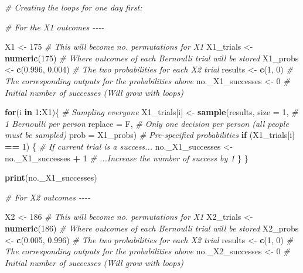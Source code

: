 \documentclass[
]{article}
\newenvironment{Shaded}{\begin{snugshade}}{\end{snugshade}}
\newcommand{\AttributeTok}[1]{\textcolor[rgb]{0.13,0.29,0.53}{#1}}
\newcommand{\CommentTok}[1]{\textcolor[rgb]{0.56,0.35,0.01}{\textit{#1}}}
\newcommand{\ControlFlowTok}[1]{\textcolor[rgb]{0.13,0.29,0.53}{\textbf{#1}}}
\newcommand{\DecValTok}[1]{\textcolor[rgb]{0.00,0.00,0.81}{#1}}
\newcommand{\FloatTok}[1]{\textcolor[rgb]{0.00,0.00,0.81}{#1}}
\newcommand{\FunctionTok}[1]{\textcolor[rgb]{0.13,0.29,0.53}{\textbf{#1}}}
\newcommand{\NormalTok}[1]{#1}
\newcommand{\OtherTok}[1]{\textcolor[rgb]{0.56,0.35,0.01}{#1}}
\newcommand{\SpecialCharTok}[1]{\textcolor[rgb]{0.81,0.36,0.00}{\textbf{#1}}}
\begin{document}
\begin{Shaded}
\begin{Highlighting}[]
\CommentTok{\# Creating the loops for one day first:}

\CommentTok{\# For the X1 outcomes {-}{-}{-}{-}}

\NormalTok{X1 }\OtherTok{\textless{}{-}} \DecValTok{175}  \CommentTok{\# This will become no. permutations for X1}
\NormalTok{X1\_trials }\OtherTok{\textless{}{-}} \FunctionTok{numeric}\NormalTok{(}\DecValTok{175}\NormalTok{)  }\CommentTok{\# Where outcomes of each Bernoulli trial will be stored}
\NormalTok{X1\_probs }\OtherTok{\textless{}{-}} \FunctionTok{c}\NormalTok{(}\FloatTok{0.996}\NormalTok{, }\FloatTok{0.004}\NormalTok{)  }\CommentTok{\# The two probabilities for each X2 trial}
\NormalTok{results }\OtherTok{\textless{}{-}} \FunctionTok{c}\NormalTok{(}\DecValTok{1}\NormalTok{, }\DecValTok{0}\NormalTok{) }\CommentTok{\# The corresponding outputs for the probabilities above }
\NormalTok{no.\_X1\_successes }\OtherTok{\textless{}{-}} \DecValTok{0}  \CommentTok{\# Initial number of successes (Will grow with loops)}


\ControlFlowTok{for}\NormalTok{(i }\ControlFlowTok{in} \DecValTok{1}\SpecialCharTok{:}\NormalTok{X1)\{  }\CommentTok{\# Sampling everyone}
\NormalTok{  X1\_trials[i] }\OtherTok{\textless{}{-}} \FunctionTok{sample}\NormalTok{(results, }
                      \AttributeTok{size =} \DecValTok{1}\NormalTok{, }\CommentTok{\# 1 Bernoulli per person}
                      \AttributeTok{replace =}\NormalTok{ F,  }\CommentTok{\# Only one decision per person (all people must be sampled)}
                      \AttributeTok{prob =}\NormalTok{ X1\_probs)  }\CommentTok{\# Pre{-}specified probabilities}
  \ControlFlowTok{if}\NormalTok{ (X1\_trials[i] }\SpecialCharTok{==} \DecValTok{1}\NormalTok{) \{  }\CommentTok{\# \textquotesingle{}If current trial is a success...\textquotesingle{}}
\NormalTok{    no.\_X1\_successes }\OtherTok{\textless{}{-}}\NormalTok{ no.\_X1\_successes }\SpecialCharTok{+} \DecValTok{1}  \CommentTok{\# \textquotesingle{}...Increase the number of success by 1}
\NormalTok{  \}}
\NormalTok{\}}

\FunctionTok{print}\NormalTok{(no.\_X1\_successes)}




\CommentTok{\# For X2 outcomes {-}{-}{-}{-}}

\NormalTok{X2 }\OtherTok{\textless{}{-}} \DecValTok{186}  \CommentTok{\# This will become no. permutations for X1}
\NormalTok{X2\_trials }\OtherTok{\textless{}{-}} \FunctionTok{numeric}\NormalTok{(}\DecValTok{186}\NormalTok{)  }\CommentTok{\# Where outcomes of each Bernoulli trial will be stored}
\NormalTok{X2\_probs }\OtherTok{\textless{}{-}} \FunctionTok{c}\NormalTok{(}\FloatTok{0.005}\NormalTok{, }\FloatTok{0.996}\NormalTok{)  }\CommentTok{\# The two probabilities for each X2 trial}
\NormalTok{results }\OtherTok{\textless{}{-}} \FunctionTok{c}\NormalTok{(}\DecValTok{1}\NormalTok{, }\DecValTok{0}\NormalTok{) }\CommentTok{\# The corresponding outputs for the probabilities above }
\NormalTok{no.\_X2\_successes }\OtherTok{\textless{}{-}} \DecValTok{0}  \CommentTok{\# Initial number of successes (Will grow with loops)}



\end{Highlighting}
\end{Shaded}
\end{document}

